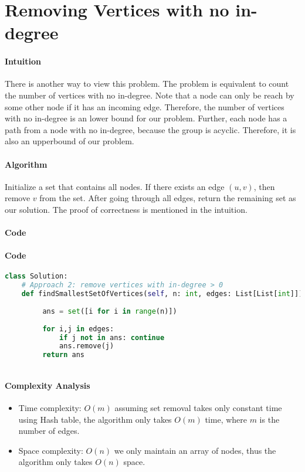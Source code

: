 \documentclass[12pt,letterpaper]{article}
\begin{document}
\section{Removing Vertices with no in-degree}

\paragraph{Intuition} There is another way to view this problem. The problem is equivalent to count the number of vertices with no in-degree. Note that a node can only be reach by some other node if it has an incoming edge. Therefore, the number of vertices with no in-degree is an lower bound for our problem.
 Further, each node has a path from a node with no in-degree, because the group is acyclic. Therefore, it is also an upperbound of our problem.


\paragraph{Algorithm}
Initialize a set that contains all nodes. If there exists an edge $(u,v)$, then remove $v$ from the set. After going through all edges, return the remaining set as our solution.
The proof of correctness is mentioned in the intuition.

\paragraph{Code}


\paragraph{Code}

\begin{lstlisting}[language = Python]
class Solution:
    # Approach 2: remove vertices with in-degree > 0
    def findSmallestSetOfVertices(self, n: int, edges: List[List[int]]) -> List[int]:
        
         ans = set([i for i in range(n)])
       
         for i,j in edges:
             if j not in ans: continue
             ans.remove(j)
         return ans
        
\end{lstlisting}

\paragraph{Complexity Analysis}
\begin{itemize}
\item Time complexity: $O(m)$ assuming set removal takes only constant time using Hash table, the algorithm only takes $O(m)$ time, where $m$ is the number of edges.

\item Space complexity: $O(n)$ we only maintain an array of nodes, thus the algorithm only takes $O(n)$ space.
\end{itemize}
\end{document}
